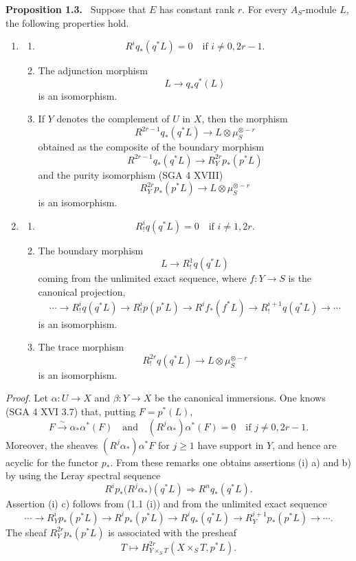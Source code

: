 \documentclass[11pt]{article}
\newenvironment{statement}[1]{\par\medskip\noindent\textbf{#1.}\ }{\par\medskip}
\begin{document}
\begin{statement}{Proposition 1.3}
Suppose that $E$ has constant rank $r$. For every $A_S$-module $L$, the following properties hold.
\begin{enumerate}[label=(\roman*)]
\item
\begin{enumerate}[label=\alph*)]
\item
\[
R^i q_*(q^*L)=0\quad\text{if }i\ne 0,2r-1.
\]
\item The adjunction morphism
\[
L\longrightarrow q_*q^*(L)
\]
is an isomorphism.
\item If $Y$ denotes the complement of $U$ in $X$, then the morphism
\[
R^{2r-1}q_*(q^*L)\longrightarrow L\otimes\mu_S^{\otimes -r}
\]
obtained as the composite of the boundary morphism
\[
R^{2r-1}q_*(q^*L)\longrightarrow R_Y^{2r}p_*(p^*L)
\tag{1}
\]
and the purity isomorphism (SGA 4 XVIII)
\[
R_Y^{2r}p_*(p^*L)\longrightarrow L\otimes\mu_S^{\otimes -r}
\]
is an isomorphism.
\end{enumerate}
\item
\begin{enumerate}[label=\alph*)]
\item
\[
R_!^i q(q^*L)=0\quad\text{if }i\ne 1,2r.
\]
\item The boundary morphism
\[
L\longrightarrow R_!^1 q(q^*L)
\]
coming from the unlimited exact sequence, where $f:Y\to S$ is the canonical projection,
\[
\cdots\longrightarrow R_!^i q(q^*L)\longrightarrow R_!^i p(p^*L)
\longrightarrow R^i f_*(f^*L)\longrightarrow R_!^{i+1}q(q^*L)\longrightarrow\cdots
\]
is an isomorphism.
\item The trace morphism
\[
R_!^{2r}q(q^*L)\longrightarrow L\otimes\mu_S^{\otimes -r}
\]
is an isomorphism.
\end{enumerate}
\end{enumerate}
\end{statement}

\emph{Proof.} Let $\alpha:U\to X$ and $\beta:Y\to X$ be the canonical immersions. One knows (SGA 4 XVI 3.7) that, putting $F=p^*(L)$,
\[
F\xrightarrow{\sim}\alpha_*\alpha^*(F)
\quad\text{and}\quad
(R^j\alpha_*)\alpha^*(F)=0\quad\text{if }j\ne0,2r-1.
\]
Moreover, the sheaves $(R^j\alpha_*)\alpha^*F$ for $j\ge1$ have support in $Y$, and hence are acyclic for the functor $p_*$. From these remarks one obtains assertions (i) a) and b) by using the Leray spectral sequence
\[
R^i p_*\bigl(R^j\alpha_*\bigr)(q^*L)\Longrightarrow R^n q_*(q^*L).
\]
Assertion (i) c) follows from (1.1 (i)) and from the unlimited exact sequence
\[
\cdots\longrightarrow R_Y^i p_*(p^*L)\longrightarrow R^i p_*(p^*L)\longrightarrow R^i q_*(q^*L)
\longrightarrow R_Y^{i+1}p_*(p^*L)\longrightarrow\cdots.
\]
The sheaf $R_Y^{2r}p_*(p^*L)$ is associated with the presheaf
\[
T\longmapsto H^{2r}_{Y\times_S T}(X\times_S T,p^*L).
\]
\end{document}
